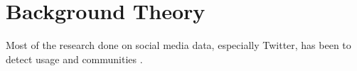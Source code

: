 
\inbpdocument{}

\chapter{Background Theory}
\label{ch:background}
Most of the research done on social media data, especially Twitter, has been to detect usage and
communities \citep{java2007we}.

\outbpdocument{
  
  
}

